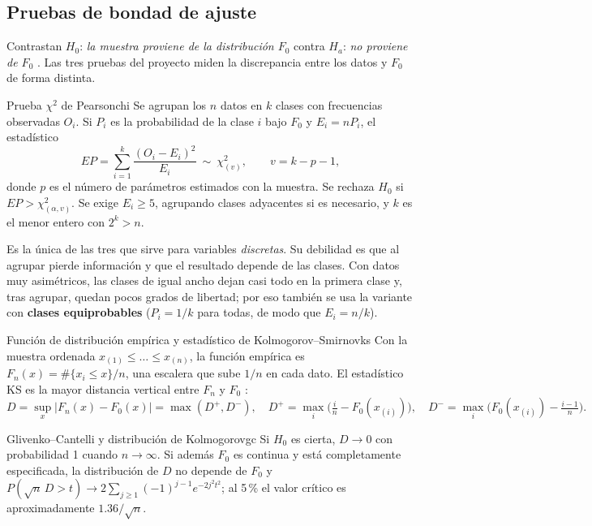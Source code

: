 \documentclass[11pt]{article}
\begin{document}
\subsection{Pruebas de bondad de ajuste}\label{sec:gof}
Contrastan $H_0$: \emph{la muestra proviene de la distribución $F_0$} contra $H_a$: \emph{no proviene de $F_0$}
\cite{guia}. Las tres pruebas del proyecto miden la discrepancia entre los datos y $F_0$ de forma distinta.

\begin{definicion}{Prueba $\chi^2$ de Pearson}{chi}
Se agrupan los $n$ datos en $k$ clases con frecuencias observadas $O_i$. Si $P_i$ es la probabilidad de la clase
$i$ bajo $F_0$ y $E_i=nP_i$, el estadístico
\[EP=\sum_{i=1}^{k}\frac{(O_i-E_i)^2}{E_i}\ \sim\ \chi^2_{(v)},\qquad v=k-p-1,\]
donde $p$ es el número de parámetros estimados con la muestra. Se rechaza $H_0$ si $EP>\chi^2_{(\alpha,v)}$. Se
exige $E_i\ge5$, agrupando clases adyacentes si es necesario, y $k$ es el menor entero con $2^k>n$.
\end{definicion}
Es la única de las tres que sirve para variables \emph{discretas}. Su debilidad es que al agrupar pierde
información y que el resultado depende de las clases. Con datos muy asimétricos, las clases de igual ancho dejan
casi todo en la primera clase y, tras agrupar, quedan pocos grados de libertad; por eso también se usa la variante
con \textbf{clases equiprobables} ($P_i=1/k$ para todas, de modo que $E_i=n/k$).

\begin{definicion}{Función de distribución empírica y estadístico de Kolmogorov–Smirnov}{ks}
Con la muestra ordenada $x_{(1)}\le\dots\le x_{(n)}$, la función empírica es $F_n(x)=\#\{x_i\le x\}/n$, una escalera
que sube $1/n$ en cada dato. El estadístico KS es la mayor distancia vertical entre $F_n$ y $F_0$
\cite{kolmogorov,smirnov}:
\[D=\sup_x\left|F_n(x)-F_0(x)\right|=\max(D^+,D^-),\quad
D^+=\max_i\Big(\tfrac{i}{n}-F_0(x_{(i)})\Big),\quad D^-=\max_i\Big(F_0(x_{(i)})-\tfrac{i-1}{n}\Big).\]
\end{definicion}
\begin{teorema}{Glivenko–Cantelli y distribución de Kolmogorov}{gc}
Si $H_0$ es cierta, $D\to0$ con probabilidad 1 cuando $n\to\infty$. Si además $F_0$ es continua y está
completamente especificada, la distribución de $D$ no depende de $F_0$ y
$P(\sqrt n\,D>t)\to2\sum_{j\ge1}(-1)^{j-1}e^{-2j^2t^2}$; al 5\,\% el valor crítico es aproximadamente $1.36/\sqrt n$.
\end{teorema}
\end{document}
